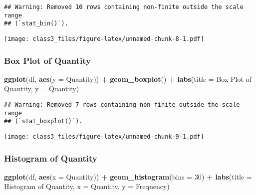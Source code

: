 \documentclass[
]{article}
\newenvironment{Shaded}{\begin{snugshade}}{\end{snugshade}}
\newcommand{\AttributeTok}[1]{\textcolor[rgb]{0.13,0.29,0.53}{#1}}
\newcommand{\DecValTok}[1]{\textcolor[rgb]{0.00,0.00,0.81}{#1}}
\newcommand{\FunctionTok}[1]{\textcolor[rgb]{0.13,0.29,0.53}{\textbf{#1}}}
\newcommand{\NormalTok}[1]{#1}
\newcommand{\SpecialCharTok}[1]{\textcolor[rgb]{0.81,0.36,0.00}{\textbf{#1}}}
\newcommand{\StringTok}[1]{\textcolor[rgb]{0.31,0.60,0.02}{#1}}
\begin{document}
\begin{verbatim}
## Warning: Removed 10 rows containing non-finite outside the scale range
## (`stat_bin()`).
\end{verbatim}

\texttt{[image: class3\_files/figure-latex/unnamed-chunk-8-1.pdf]}

\subsubsection{Box Plot of Quantity}\label{box-plot-of-quantity}

\begin{Shaded}
\begin{Highlighting}[]
\FunctionTok{ggplot}\NormalTok{(df, }\FunctionTok{aes}\NormalTok{(}\AttributeTok{y =}\NormalTok{ Quantity)) }\SpecialCharTok{+}
  \FunctionTok{geom\_boxplot}\NormalTok{() }\SpecialCharTok{+}
  \FunctionTok{labs}\NormalTok{(}\AttributeTok{title =} \StringTok{\textquotesingle{}Box Plot of Quantity\textquotesingle{}}\NormalTok{, }\AttributeTok{y =} \StringTok{\textquotesingle{}Quantity\textquotesingle{}}\NormalTok{)}
\end{Highlighting}
\end{Shaded}

\begin{verbatim}
## Warning: Removed 7 rows containing non-finite outside the scale range
## (`stat_boxplot()`).
\end{verbatim}

\texttt{[image: class3\_files/figure-latex/unnamed-chunk-9-1.pdf]}

\subsubsection{Histogram of Quantity}\label{histogram-of-quantity}

\begin{Shaded}
\begin{Highlighting}[]
\FunctionTok{ggplot}\NormalTok{(df, }\FunctionTok{aes}\NormalTok{(}\AttributeTok{x =}\NormalTok{ Quantity)) }\SpecialCharTok{+}
  \FunctionTok{geom\_histogram}\NormalTok{(}\AttributeTok{bins =} \DecValTok{30}\NormalTok{) }\SpecialCharTok{+}
  \FunctionTok{labs}\NormalTok{(}\AttributeTok{title =} \StringTok{\textquotesingle{}Histogram of Quantity\textquotesingle{}}\NormalTok{, }\AttributeTok{x =} \StringTok{\textquotesingle{}Quantity\textquotesingle{}}\NormalTok{, }\AttributeTok{y =} \StringTok{\textquotesingle{}Frequency\textquotesingle{}}\NormalTok{)}
\end{Highlighting}
\end{Shaded}
\end{document}
